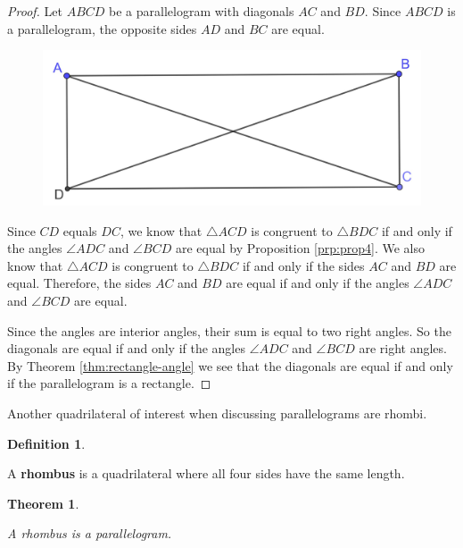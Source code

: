 \documentclass[
]{book}
\newtheorem{theorem}{Theorem}[chapter]
\theoremstyle{definition}
\newtheorem{definition}{Definition}[chapter]
\theoremstyle{definition}
\theoremstyle{definition}
\theoremstyle{definition}
\theoremstyle{remark}
\begin{document}
\begin{proof}

Let \(ABCD\) be a parallelogram with diagonals \(AC\) and \(BD\). Since \(ABCD\) is a parallelogram, the opposite sides \(AD\) and \(BC\) are equal.

\begin{figure}

{\centering \includegraphics[width=0.5\linewidth]{images/Rectangle-Diagonals} 

}

\end{figure}

Since \(CD\) equals \(DC\), we know that \(\triangle ACD\) is congruent to \(\triangle BDC\) if and only if the angles \(\angle ADC\) and \(\angle BCD\) are equal by Proposition \ref{prp:prop4}. We also know that \(\triangle ACD\) is congruent to \(\triangle BDC\) if and only if the sides \(AC\) and \(BD\) are equal. Therefore, the sides \(AC\) and \(BD\) are equal if and only if the angles \(\angle ADC\) and \(\angle BCD\) are equal.

Since the angles are interior angles, their sum is equal to two right angles. So the diagonals are equal if and only if the angles \(\angle ADC\) and \(\angle BCD\) are right angles. By Theorem \ref{thm:rectangle-angle} we see that the diagonals are equal if and only if the parallelogram is a rectangle.

\end{proof}

Another quadrilateral of interest when discussing parallelograms are rhombi.

\begin{definition}
\protect\hypertarget{def:unlabeled-div-171}{}\label{def:unlabeled-div-171}

A \textbf{rhombus} is a quadrilateral where all four sides have the same length.

\end{definition}

\begin{theorem}
\protect\hypertarget{thm:unlabeled-div-172}{}\label{thm:unlabeled-div-172}

A rhombus is a parallelogram.

\end{theorem}
\end{document}
